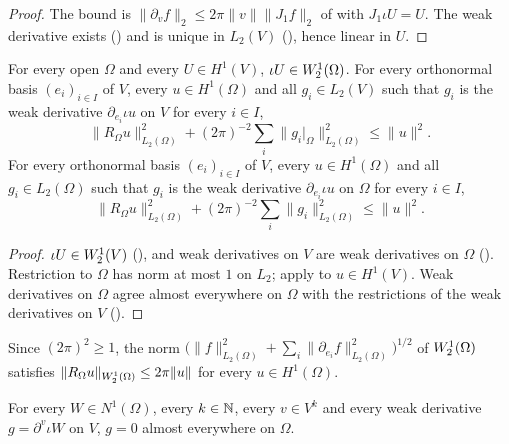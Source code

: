 \begin{proof}
\leanok
The bound is $\|\partial_v f\|_2 \leq 2 \pi \|v\| \|J_1 f\|_2$ of  with
$J_1 \iota U = U$. The weak derivative exists () and is
unique in $L_2(V)$ (), hence linear in $U$.
\end{proof}

\begin{proposition}
\label{prop:sobolev-restriction-weak-gradient}
\leanok
{}
For every open $\Omega$ and every $U \in H^1(V)$, $\iota U \in W^{1}_{2}(\Omega)$. For every
orthonormal basis $(e_i)_{i \in I}$ of $V$, every $u \in H^1(\Omega)$ and all $g_i \in L_2(V)$
such that $g_i$ is the weak derivative $\partial_{e_i} \iota u$ on $V$ for every $i \in I$,
\[
  \|R_\Omega u\|_{L_2(\Omega)}^2 + (2 \pi)^{-2} \sum_i \|g_i|_\Omega\|_{L_2(\Omega)}^2
  \leq \|u\|^2 .
\]
For every orthonormal basis $(e_i)_{i \in I}$ of $V$, every $u \in H^1(\Omega)$ and all
$g_i \in L_2(\Omega)$ such that $g_i$ is the weak derivative $\partial_{e_i} \iota u$ on $\Omega$
for every $i \in I$,
\[
  \|R_\Omega u\|_{L_2(\Omega)}^2 + (2 \pi)^{-2} \sum_i \|g_i\|_{L_2(\Omega)}^2 \leq \|u\|^2 .
\]
\end{proposition}

\begin{proof}
\leanok
$\iota U \in W^{1}_{2}(V)$ (), and weak derivatives on
$V$ are weak derivatives on $\Omega$ (). Restriction to $\Omega$
has norm at most $1$ on $L_2$; apply  to
$u \in H^1(V)$. Weak derivatives on $\Omega$ agree almost everywhere on $\Omega$ with the
restrictions of the weak derivatives on $V$ ().
\end{proof}

Since $(2\pi)^2 \geq 1$, the norm
$\bigl(\|f\|_{L_2(\Omega)}^2 + \sum_i \|\partial_{e_i} f\|_{L_2(\Omega)}^2\bigr)^{1/2}$ of
$W^{1}_{2}(\Omega)$ satisfies $\|R_\Omega u\|_{W^{1}_{2}(\Omega)} \leq 2\pi \|u\|$ for every
$u \in H^1(\Omega)$.

\begin{lemma}
\label{lem:weak-derivative-vanishing}
\leanok
{}
For every $W \in N^1(\Omega)$, every $k \in \mathbb{N}$, every $v \in V^k$ and every weak derivative
$g = \partial^v \iota W$ on $V$, $g = 0$ almost everywhere on $\Omega$.
\end{lemma}

